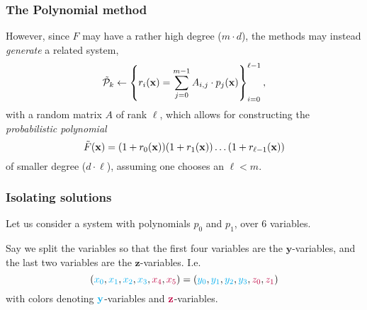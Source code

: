 \documentclass{beamer}
\begin{document}
\begin{frame}
    \frametitle{The Polynomial method}
    However, since $F$ may have a rather high degree ($m \cdot d$), the methods may instead \textit{generate} a related system, 
    $$
        \Tilde{\mathcal{P}}_k \gets \left\{r_i(\mathbf{x}) = \sum_{j = 0}^{m-1}A_{i,j} \cdot p_j(\mathbf{x})\right\}^{\ell - 1}_{i = 0},
    $$
    with a random matrix $A$ of rank $\ell$, which allows for constructing the \textit{probabilistic polynomial}
    $$
        \Tilde{F}(\mathbf{x}) = (1 + r_0(\mathbf{x}))(1 + r_1(\mathbf{x})) \dots (1 + r_{\ell - 1}(\mathbf{x})) 
    $$
    of smaller degree ($d \cdot \ell$), assuming one chooses an $\ell < m$.
\end{frame}

\begin{frame}
    \frametitle{Isolating solutions}
    Let us consider a system with polynomials $p_0$ and $p_1$, over $6$ variables. 

    \pause
    Say we split the variables so that the first four variables are the $\mathbf{y}$-variables, and the last two variables are the $\mathbf{z}$-variables. I.e. 
    $$
        ({\color{cyan}x_0}, {\color{cyan}x_1}, {\color{cyan}x_2}, {\color{cyan}x_3}, {\color{purple}x_4}, {\color{purple}x_5}) = ({\color{cyan}y_0}, {\color{cyan}y_1}, {\color{cyan}y_2}, {\color{cyan}y_3}, {\color{purple}z_0}, {\color{purple}z_1})
    $$
    with colors denoting $\color{cyan}\mathbf{y}$-variables and $\color{purple}\mathbf{z}$-variables.
\end{frame}
\end{document}

